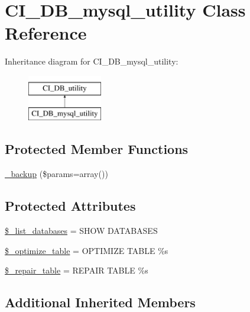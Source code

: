 \hypertarget{class_c_i___d_b__mysql__utility}{}\section{C\+I\+\_\+\+D\+B\+\_\+mysql\+\_\+utility Class Reference}
\label{class_c_i___d_b__mysql__utility}
Inheritance diagram for C\+I\+\_\+\+D\+B\+\_\+mysql\+\_\+utility\+:\begin{figure}[H]
\begin{center}
\leavevmode
\includegraphics[height=2.000000cm]{class_c_i___d_b__mysql__utility}
\end{center}
\end{figure}
\subsection*{Protected Member Functions}
\begin{DoxyCompactItemize}
\item 
\hyperlink{class_c_i___d_b__mysql__utility_a30f3053d2c82e7562349924363507afa}{\+\_\+backup} (\$params=array())
\end{DoxyCompactItemize}
\subsection*{Protected Attributes}
\begin{DoxyCompactItemize}
\item 
\hyperlink{class_c_i___d_b__mysql__utility_afe3a5b80562d93d6bc7e2b53c95b7e5a}{\$\+\_\+list\+\_\+databases} = \textquotesingle{}S\+H\+O\+W D\+A\+T\+A\+B\+A\+S\+E\+S\textquotesingle{}
\item 
\hyperlink{class_c_i___d_b__mysql__utility_a083199e5c22c78912dae0a47bb2d7fad}{\$\+\_\+optimize\+\_\+table} = \textquotesingle{}O\+P\+T\+I\+M\+I\+Z\+E T\+A\+B\+L\+E \%s\textquotesingle{}
\item 
\hyperlink{class_c_i___d_b__mysql__utility_a5cf925cbd52e3f6ba5b7ada3fa436efc}{\$\+\_\+repair\+\_\+table} = \textquotesingle{}R\+E\+P\+A\+I\+R T\+A\+B\+L\+E \%s\textquotesingle{}
\end{DoxyCompactItemize}
\subsection*{Additional Inherited Members}


